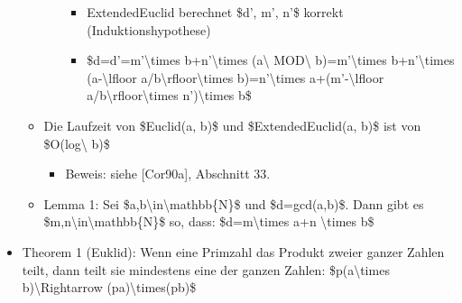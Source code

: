 \documentclass[a4paper]{article}
\begin{document}
\begin{multicols}{3}
\begin{itemize}
\begin{itemize}
\begin{itemize}
                                  \begin{itemize}
                                      \item
                                            ExtendedEuclid berechnet \$d', m', n'\$ korrekt
                                            (Induktionshypothese)
                                      \item
                                            \$d=d'=m'\textbackslash times b+n'\textbackslash times
                                            (a\textbackslash{} MOD\textbackslash{} b)=m'\textbackslash times
                                            b+n'\textbackslash times (a-\textbackslash lfloor
                                            a/b\textbackslash rfloor\textbackslash times
                                            b)=n'\textbackslash times a+(m'-\textbackslash lfloor
                                            a/b\textbackslash rfloor\textbackslash times
                                            n')\textbackslash times b\$
                                  \end{itemize}
                        \end{itemize}
                  \item
                        Die Laufzeit von \$Euclid(a, b)\$ und \$ExtendedEuclid(a, b)\$ ist
                        von \$O(log\textbackslash{} b)\$

                        \begin{itemize}
                            \item
                                  Beweis: siehe {[}Cor90a{]}, Abschnitt 33.
                        \end{itemize}
                  \item
                        Lemma 1: Sei \$a,b\textbackslash in\textbackslash mathbb\{N\}\$ und
                        \$d=gcd(a,b)\$. Dann gibt es
                        \$m,n\textbackslash in\textbackslash mathbb\{N\}\$ so, dass:
                        \$d=m\textbackslash times a+n \textbackslash times b\$
              \end{itemize}
        \item
              Theorem 1 (Euklid): Wenn eine Primzahl das Produkt zweier ganzer
              Zahlen teilt, dann teilt sie mindestens eine der ganzen Zahlen:
              \$p\textbar(a\textbackslash times b)\textbackslash Rightarrow
              (p\textbar a)\textbackslash times(p\textbar b)\$


\end{itemize}
\end{multicols}
\end{document}
